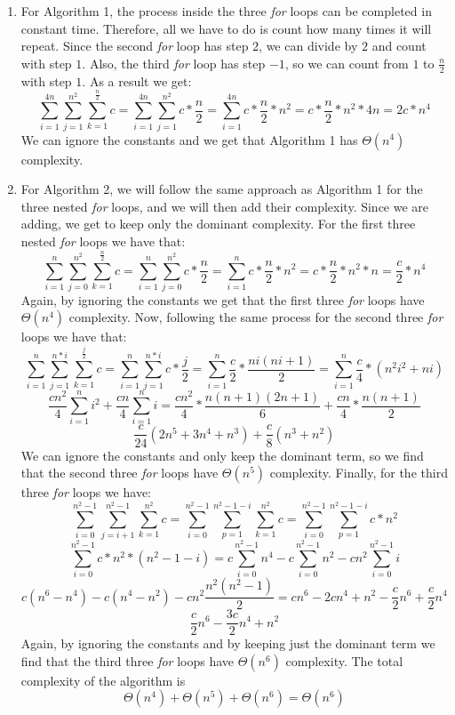 \documentclass[12pt]{article}
\begin{document}
\begin{enumerate}
\item For Algorithm 1, the process inside the three \textit{for} loops can be completed in constant time. Therefore, all we have to do is count how many times it will repeat. Since the second \textit{for} loop has step $2$, we can divide by $2$ and count with step $1$. Also, the third \textit{for} loop has step $-1$, so we can count from $1$ to $\frac{n}{2}$ with step $1$.
As a result we get: $$\sum_{i=1}^{4n}{\sum_{j=1}^{n^2}{\sum_{k=1}^{\frac{n}{2}}{c}}} = \sum_{i=1}^{4n}{\sum_{j=1}^{n^2}{c*\frac{n}{2}}} = \sum_{i=1}^{4n}{c*\frac{n}{2}*n^2} = c*\frac{n}{2}*n^2*4n = 2c*n^4$$
We can ignore the constants and we get that Algorithm 1 has $\Theta(n^4)$ complexity.

\item  For Algorithm 2, we will follow the same approach as Algorithm 1 for the three nested \textit{for} loops, and we will then add their complexity. Since we are adding, we get to keep only the dominant complexity. For the first three nested \textit{for} loops we have that: 
$$\sum_{i=1}^{n}{\sum_{j=0}^{n^2}{\sum_{k=1}^{\frac{n}{2}}{c}}} = \sum_{i=1}^{n}{\sum_{j=0}^{n^2}{c*\frac{n}{2}}} = \sum_{i=1}^{n}{c*\frac{n}{2}*n^2} = c*\frac{n}{2}*n^2*n = \frac{c}{2}*n^4$$
Again, by ignoring the constants we get that the first three \textit{for} loops have $\Theta(n^4)$ complexity. Now, following the same process for the second three \textit{for} loops we have that:
$$\sum_{i=1}^{n}{\sum_{j=1}^{n*i}{\sum_{k=1}^{\frac{j}{2}}{c}}} = \sum_{i=1}^{n}{\sum_{j=1}^{n*i}{c*\frac{j}{2}}} = \sum_{i=1}^{n}{\frac{c}{2}*\frac{ni(ni+1)}{2}} = \sum_{i=1}^{n}{\frac{c}{4}*(n^2i^2 + ni)}$$ $$\frac{cn^2}{4}\sum_{i=1}^{n} {i^2} + \frac{cn}{4}\sum_{i=1}^{n} {i} = \frac{cn^2}{4}*\frac{n(n+1)(2n+1)}{6} + \frac{cn}{4}*\frac{n(n+1)}{2}$$ $$\frac{c}{24}(2n^5 + 3n^4 + n^3) + \frac{c}{8}(n^3+n^2)$$
We can ignore the constants and only keep the dominant term, so we find that the second three \textit{for} loops have $\Theta(n^5)$ complexity. Finally, for the third three \textit{for} loops we have: $$\sum_{i=0}^{n^2-1} {\sum_{j=i+1}^{n^2-1} {\sum_{k=1}^{n^2} {c}}} = \sum_{i=0}^{n^2-1} {\sum_{p=1}^{n^2-1-i} {\sum_{k=1}^{n^2} {c}}} = \sum_{i=0}^{n^2-1} {\sum_{p=1}^{n^2-1-i} {c*n^2}}$$ $$ \sum_{i=0}^{n^2-1} {c*n^2*(n^2-1-i)} = c\sum_{i=0}^{n^2-1} {n^4} - c\sum_{i=0}^{n^2-1} {n^2} - cn^2\sum_{i=0}^{n^2-1} {i}$$ $$c(n^6-n^4)-c(n^4-n^2)-cn^2\frac{n^2(n^2-1)}{2} = cn^6-2cn^4+n^2-\frac{c}{2}n^6+\frac{c}{2}n^4$$ $$\frac{c}{2}n^6-\frac{3c}{2}n^4+n^2$$ Again, by ignoring the constants and by keeping just the dominant term we find that the third three \textit{for} loops have $\Theta(n^6)$ complexity. The total complexity of the algorithm is $$\Theta(n^4)+\Theta(n^5)+\Theta(n^6) = \Theta(n^6)$$
\end{enumerate}
\end{document}
